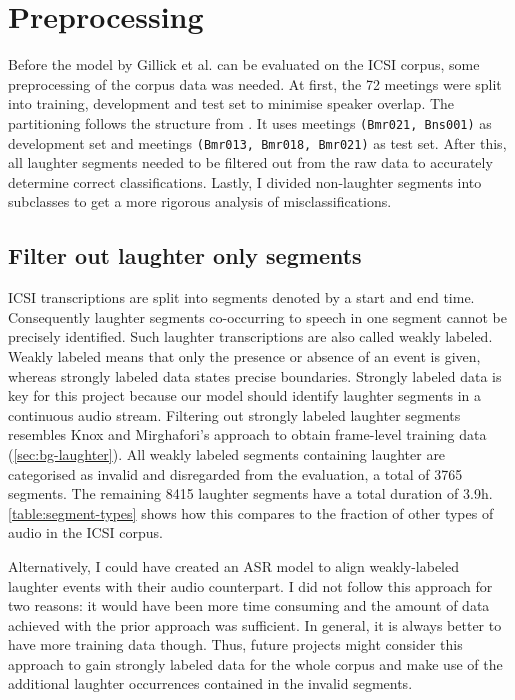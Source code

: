 \documentclass[bsc,frontabs,parskip,deptreport]{infthesis}
\begin{document}
\section{Preprocessing} \label{sec:preprocessing}
Before the model by Gillick et al. can be evaluated on the ICSI corpus, some preprocessing of the corpus data was needed.
At first, the 72 meetings were split into training, development and test set to minimise speaker overlap. The partitioning follows the structure from \citeauthor{renals2014neural}. It uses meetings \texttt{(Bmr021, Bns001)} as development set and meetings \texttt{(Bmr013, Bmr018, Bmr021)} as test set.
After this, all laughter segments needed to be filtered out from the raw data to accurately determine correct classifications. 
Lastly, I divided non-laughter segments into subclasses to get a more rigorous analysis of misclassifications.

\subsection{Filter out laughter only segments} \label{subsec:filter-laughter}
ICSI transcriptions are split into segments denoted by a start and end time.
Consequently laughter segments co-occurring to speech in one segment cannot be precisely identified.
Such laughter transcriptions are also called weakly labeled. Weakly labeled means that only the presence or absence of an event is given, whereas strongly labeled data states precise boundaries.
Strongly labeled data is key for this project because our model should identify laughter segments in a continuous audio stream.
Filtering out strongly labeled laughter segments resembles Knox and Mirghafori's approach to obtain frame-level training data \citep{knox2006automatic} (\autoref{sec:bg-laughter}). 
All weakly labeled segments containing laughter are categorised as invalid and disregarded from the evaluation, a total of 3765 segments.
The remaining 8415 laughter segments have a total duration of 3.9h. \autoref{table:segment-types} shows how this compares to the fraction of other types of audio in the ICSI corpus.

Alternatively, I could have created an ASR model to align weakly-labeled laughter events with their audio counterpart. 
I did not follow this approach for two reasons: it would have been more time consuming and the amount of data achieved with the prior approach was sufficient. 
In general, it is always better to have more training data though. Thus, future projects might consider this approach to gain strongly labeled data for the whole corpus and make use of the additional laughter occurrences contained in the invalid segments. 
\end{document}
